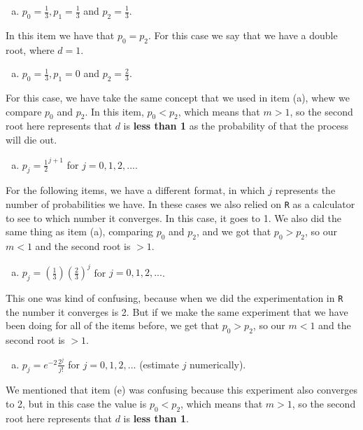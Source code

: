 \documentclass{article}
\begin{document}
\begin{enumerate}[(b)]
\item $p_0=\frac{1}{3}, p_1 = \frac{1}{3}$ and $p_2 = \frac{1}{3}$.
\end{enumerate}
In this item we have that $p_0 = p_2$. For this case we say that we have a double root, where $d =1$.

\begin{enumerate}[(c)]
\item $p_0=\frac{1}{3}, p_1 = 0$ and $p_2 = \frac{2}{3}$.
\end{enumerate}
For this case, we have take the same concept that we used in item (a), whew we compare $p_0$ and $p_2$. In this item, $p_0 < p_2$, which means that $m >1$, so the second root here represents that $d$ is \textbf{less than 1} as the probability of that the process will die out.

\begin{enumerate}[(d)]
\item $p_j = \frac{1}{2}^{j+1}$ for $j = 0, 1, 2, ...$.
\end{enumerate}

For the following items, we have a different format, in which $j$ represents the number of probabilities we have. In these cases we also relied on \texttt{R} as a calculator to see to which number it converges. In this case, it goes to 1. We also did the same thing as item (a), comparing $p_0$ and $p_2$, and we got that $p_0 > p_2$, so our $m < 1$ and the second root is $> 1$.

\begin{enumerate}[(e)]
\item $p_j = \left(\frac{1}{3}\right)\left(\frac{2}{3}\right)^{j}$ for $j = 0, 1, 2, ...$.
\end{enumerate}

This one was kind of confusing, because when we did the experimentation in \texttt{R} the number it converges is 2. But if we make the same experiment that we have been doing for all of the items before, we get that $p_0 > p_2$, so our $m<1$ and the second root is $> 1$.

\begin{enumerate}[(f)]
\item $p_j = e^{-2}\frac{2^j}{j!}$ for $j = 0, 1, 2, ...$ (estimate $j$ numerically).
\end{enumerate}
We mentioned that item (e) was confusing because this experiment also converges to 2, but in this case the value is $p_0 < p_2$, which means that $m >1$, so the second root here represents that $d$ is \textbf{less than 1}.
\end{document}
